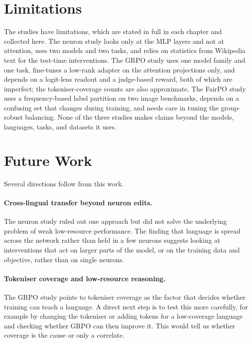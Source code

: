 \section{Limitations}
\label{sec:conclusion-limitations}

The studies have limitations, which are stated in full in each chapter and collected
here. The neuron study looks only at the MLP layers and not at attention, uses two
models and two tasks, and relies on statistics from Wikipedia text for the test-time
interventions. The GRPO study uses one model family and one task, fine-tunes a
low-rank adapter on the attention projections only, and depends on a logit-lens
readout and a judge-based reward, both of which are imperfect; the tokeniser-coverage
counts are also approximate. The FairPO study uses a frequency-based label partition
on two image benchmarks, depends on a confusing set that changes during training, and
needs care in tuning the group-robust balancing. None of the three studies makes
claims beyond the models, languages, tasks, and datasets it uses.

\section{Future Work}
\label{sec:conclusion-future}

Several directions follow from this work.

\paragraph{Cross-lingual transfer beyond neuron edits.}
The neuron study ruled out one approach but did not solve the underlying problem of
weak low-resource performance. The finding that language is spread across the network
rather than held in a few neurons suggests looking at interventions that act on
larger parts of the model, or on the training data and objective, rather than on
single neurons.

\paragraph{Tokeniser coverage and low-resource reasoning.}
The GRPO study points to tokeniser coverage as the factor that decides whether
training can teach a language. A direct next step is to test this more carefully, for
example by changing the tokeniser or adding tokens for a low-coverage language and
checking whether GRPO can then improve it. This would tell us whether coverage is the
cause or only a correlate.

